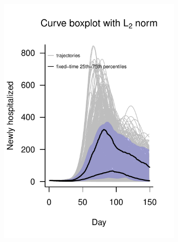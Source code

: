 \documentclass[12pt]{article}
\theoremstyle{definition} %
\begin{document}
\begin{figure}[h!]
\begin{subfigure}[t]{.45\textwidth}
\includegraphics[width=\linewidth]{scripts/pix/L2_juul.pdf}
\caption{}\label{p.c}
\end{subfigure}
%
\begin{subfigure}[t]{.45\textwidth}
\centering

\end{subfigure}
\end{figure}
\end{document}
